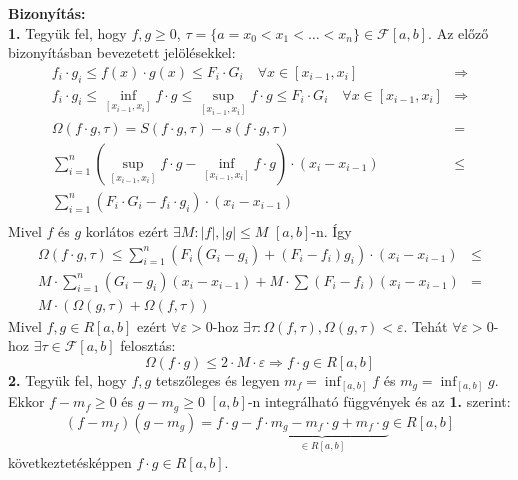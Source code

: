 \documentclass{article}
\renewenvironment{proof}{\textbf{Bizonyítás:} \\}{\hfill}
\begin{document}
\begin{proof}
\textbf{1.} Tegyük fel, hogy $f,g \geq 0$, $\tau = \{a = x_0 < x_1 < \dots < x_n \} \in \mathcal{F}[a,b]$. Az előző bizonyításban bevezetett jelölésekkel:
\begin{equation*}
\begin{split}
    f_i\cdot g_i \leq f(x)\cdot g(x) \leq F_i\cdot G_i\quad \forall x\in[x_{i-1},x_i] & \Longrightarrow \\
    f_i\cdot g_i \leq \inf_{[x_{i-1},x_i]}f\cdot g \leq \sup_{[x_{i-1},x_i]} f\cdot g\leq F_i\cdot G_i\quad \forall x \in [x_{i-1},x_i] & \Longrightarrow \\
    \Omega(f\cdot g, \tau)=S(f\cdot g,\tau)-s(f\cdot g, \tau) & = \\
    \sum_{i=1}^n \left(\sup_{[x_{i-1},x_i]}f\cdot g - \inf_{[x_{i-1},x_i]}f\cdot g\right)\cdot (x_i-x_{i-1}) & \leq \\
    \sum_{i=1}^n \left(F_i\cdot G_i - f_i \cdot g_i\right)\cdot (x_i-x_{i-1}) & \\
\end{split}
\end{equation*}
Mivel $f$ és $g$ korlátos ezért $\exists M: |f|,|g|\leq M$ $[a,b]$-n. Így
\begin{equation*}
\begin{split}
    \Omega(f\cdot g, \tau)\leq \sum_{i=1}^n \left(F_i(G_i-g_i)+(F_i-f_i)g_i\right)\cdot (x_i-x_{i-1}) & \leq \\
    M\cdot\sum_{i=1}^n(G_i-g_i)(x_i-x_{i-1})+M\cdot\sum(F_i-f_i)(x_i-x_{i-1}) & = \\
    M\cdot \left(\Omega(g,\tau)+\Omega(f,\tau)\right)
\end{split}
\end{equation*}
Mivel $f,g\in R[a,b]$ ezért $\forall \varepsilon >0$-hoz $\exists\tau : \Omega(f,\tau), \Omega(g,\tau)< \varepsilon$. Tehát $\forall \varepsilon > 0$-hoz $\exists\tau \in \mathcal{F}[a,b]$ felosztás:
\begin{equation*}
    \Omega(f\cdot g)\leq 2\cdot M \cdot \varepsilon \Longrightarrow f\cdot g \in R[a,b]
\end{equation*}
\textbf{2.} Tegyük fel, hogy $f,g$ tetszőleges és legyen $m_f = \displaystyle\inf_{[a,b]}f$ és $m_g = \displaystyle\inf_{[a,b]}g$. Ekkor $f-m_f\geq 0$ és $g-m_g\geq 0$ $[a,b]$-n integrálható függvények és az \textbf{1.} szerint:
\begin{equation*}
    (f-m_f)(g-m_g)=f\cdot g - \underbrace{f\cdot m_g - m_f \cdot g + m_f \cdot g}_{\in R[a,b]} \in R[a,b]
\end{equation*}
következtetésképpen $f\cdot g \in R[a,b]$.
\end{proof}
\end{document}
